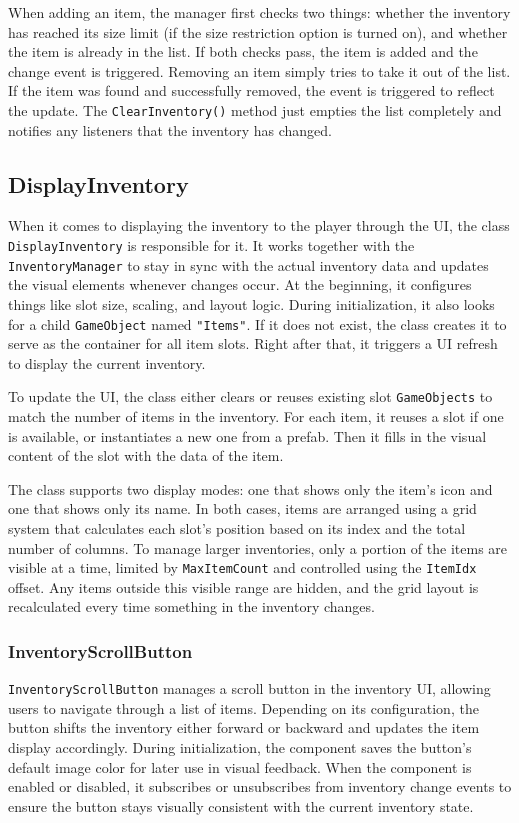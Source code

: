 When adding an item, the manager first checks two things: whether the inventory has reached its size limit (if the size restriction option is turned on), and whether the item is already in the list. If both checks pass, the item is added and the change event is triggered. Removing an item simply tries to take it out of the list. If the item was found and successfully removed, the event is triggered to reflect the update. The \verb|ClearInventory()| method just empties the list completely and notifies any listeners that the inventory has changed.

\subsection{DisplayInventory}
\label{DisplayInventory}
When it comes to displaying the inventory to the player through the UI, the class \verb|DisplayInventory| is responsible for it. It works together with the \verb|InventoryManager| to stay in sync with the actual inventory data and updates the visual elements whenever changes occur. At the beginning, it configures things like slot size, scaling, and layout logic. During initialization, it also looks for a child \verb|GameObject| named \verb|"Items"|. If it does not exist, the class creates it to serve as the container for all item slots. Right after that, it triggers a UI refresh to display the current inventory.

To update the UI, the class either clears or reuses existing slot \verb|GameObjects| to match the number of items in the inventory. For each item, it reuses a slot if one is available, or instantiates a new one from a prefab. Then it fills in the visual content of the slot with the data of the item.

The class supports two display modes: one that shows only the item's icon and one that shows only its name. In both cases, items are arranged using a grid system that calculates each slot’s position based on its index and the total number of columns. To manage larger inventories, only a portion of the items are visible at a time, limited by \verb|MaxItemCount| and controlled using the \verb|ItemIdx| offset. Any items outside this visible range are hidden, and the grid layout is recalculated every time something in the inventory changes.
 
\subsubsection{InventoryScrollButton}
\verb|InventoryScrollButton| manages a scroll button in the inventory UI, allowing users to navigate through a list of items. Depending on its configuration, the button shifts the inventory either forward or backward and updates the item display accordingly. During initialization, the component saves the button's default image color for later use in visual feedback. When the component is enabled or disabled, it subscribes or unsubscribes from inventory change events to ensure the button stays visually consistent with the current inventory state.

